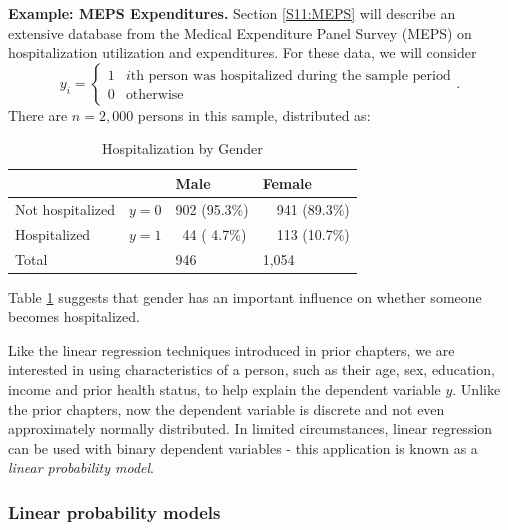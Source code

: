 \textbf{Example: MEPS Expenditures.}
Section \ref{S11:MEPS} will describe an extensive database from the
Medical Expenditure Panel Survey (MEPS) on hospitalization
utilization and expenditures. For these data, we will consider
\begin{equation*}
y_i = \left\{
\begin{array}{ll}
1 & i\text{th person was hospitalized during the sample period} \\
0 & \text{otherwise}%
\end{array}%
\right. .
\end{equation*}%
There are $n=2,000$ persons in this sample, distributed as:
\vspace{-.2in}
   \begin{center}  \begin{table}[h]
\caption{\label{T11:MEPSIntroStats} Hospitalization by Gender}
\begin{tabular}{ll|ll}
\hline
 &  &  Male & Female   \\ \hline
Not hospitalized & $y=0$ & 902 (95.3\%) & ~~941 (89.3\%)\\
Hospitalized & $y=1$ &  ~44 ( 4.7\%)  & ~~113 (10.7\%)\\
 Total &       & 946  & 1,054 \\
 \hline
\end{tabular}
\end{table}  \end{center}  
\noindent Table \ref{T11:MEPSIntroStats} suggests that gender has an
important influence on whether someone becomes hospitalized.

\linejed
\bigskip

Like the linear regression techniques introduced in prior chapters, we are
interested in using characteristics of a person, such as their age, sex,
education, income and prior health status, to help explain the
dependent variable $y$. Unlike the prior chapters, now the dependent
variable is discrete and not even approximately normally distributed. In
limited circumstances, linear regression can be used with binary dependent
variables - this application is known as a \emph{linear probability model}.

\subsubsection*{Linear probability models}

